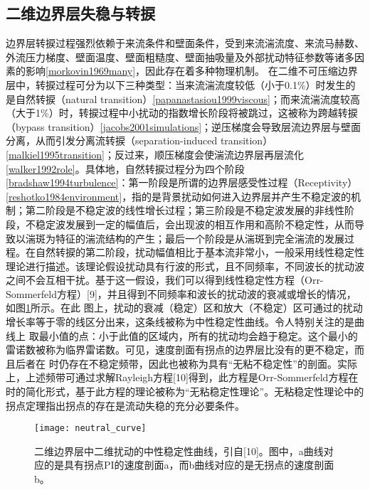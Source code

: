 \subsection{二维边界层失稳与转捩}
边界层转捩过程强烈依赖于来流条件和壁面条件，受到来流湍流度、来流马赫数、外流压力梯度、壁面温度、壁面粗糙度、壁面抽吸量及外部扰动特征参数等诸多因素的影响\ref{morkovin1969many}，因此存在着多种物理机制。
在二维不可压缩边界层中，转捩过程可分为以下三种类型：当来流湍流度较低（小于0.1\%）时发生的是自然转捩（natural transition）\ref{papanastasiou1999viscous}；而来流湍流度较高（大于1\%）时，转捩过程中小扰动的指数增长阶段将被跳过，这被称为跨越转捩（bypass transition）\ref{jacobs2001simulations}；逆压梯度会导致层流边界层与壁面分离，从而引发分离流转捩（separation-induced transition）\ref{malkiel1995transition}；反过来，顺压梯度会使湍流边界层再层流化\ref{walker1992role}。具体地，自然转捩过程分为四个阶段\ref{bradshaw1994turbulence}：第一阶段是所谓的边界层感受性过程（Receptivity）\ref{reshotko1984environment}，指的是背景扰动如何进入边界层并产生不稳定波的机制；第二阶段是不稳定波的线性增长过程；第三阶段是不稳定波发展的非线性阶段，不稳定波发展到一定的幅值后，会出现波的相互作用和高阶不稳定性，从而导致以湍斑为特征的湍流结构的产生；最后一个阶段是从湍斑到完全湍流的发展过程。在自然转捩的第二阶段，扰动幅值相比于基本流非常小，一般采用线性稳定性理论进行描述。该理论假设扰动具有行波的形式，且不同频率，不同波长的扰动波之间不会互相干扰。基于这一假设，我们可以得到线性稳定性方程（Orr-Sommerfeld方程）[9]，并且得到不同频率和波长的扰动波的衰减或增长的情况，如图\ref{f:neutral_curve}所示。在此 图上，扰动的衰减（稳定）区和放大（不稳定）区可通过的扰动增长率等于零的线区分出来，这条线被称为中性稳定性曲线。令人特别关注的是曲线上 取最小值的点：小于此值的区域内，所有的扰动均会趋于稳定。这个最小的雷诺数被称为临界雷诺数。可见，速度剖面有拐点的边界层比没有的更不稳定，而且后者在 时仍存在不稳定频带，因此也被称为具有“无粘不稳定性”的剖面。实际上，上述频带可通过求解Rayleigh方程[10]得到，此方程是Orr-Sommerfeld方程在 时的简化形式，基于此方程的理论被称为“无粘稳定性理论”。无粘稳定性理论中的拐点定理指出拐点的存在是流动失稳的充分必要条件。
\begin{figure}
  \centering
  \texttt{[image: neutral\_curve]}
  \caption{二维边界层中二维扰动的中性稳定性曲线，引自[10]。图中，a曲线对应的是具有拐点PI的速度剖面a，而b曲线对应的是无拐点的速度剖面b。}\label{f:neutral_curve}
\end{figure}

